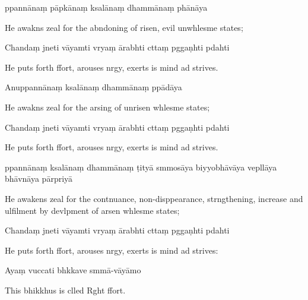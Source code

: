 ppannānaṃ pāpkānaṃ ksalānaṃ dhammānaṃ phānāya

\begin{english}
  He awakns zeal for the abndoning of risen, evil unwhlesme states;
\end{english}

Chandaṃ jneti vāyamti vryaṃ ārabhti cttaṃ pggaṇhti pdahti

\begin{english}
  He puts forth ffort, arouses nrgy, exerts is mind ad strives.
\end{english}

Anuppannānaṃ ksalānaṃ dhammānaṃ ppādāya

\begin{english}
  He awakns zeal for the arsing of unrisen whlesme states;
\end{english}

Chandaṃ jneti vāyamti vryaṃ ārabhti cttaṃ pggaṇhti pdahti

\begin{english}
  He puts forth ffort, arouses nrgy, exerts is mind ad strives.
\end{english}

ppannānaṃ ksalānaṃ dhammānaṃ ṭityā smmosāya biyyobhāvāya vepllāya bhāvnāya pārpriyā

\begin{english}
  He awakens zeal for the contnuance, non-disppearance, strngthening, increase and ulfilment by devlpment of arsen whlesme states;
\end{english}

Chandaṃ jneti vāyamti vryaṃ ārabhti cttaṃ pggaṇhti pdahti

\begin{english}
  He puts forth ffort, arouses nrgy, exerts is mind ad strives:
\end{english}

Ayaṃ vuccati bhkkave smmā-vāyāmo

\begin{english}
  This bhikkhus is clled Rght ffort.
\end{english}

